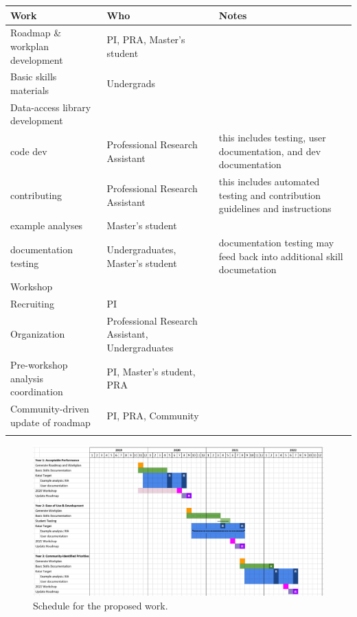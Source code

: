 \begin{tabularx}{\textwidth}{XXX}
Work & Who & Notes \\
\toprule
Roadmap \& workplan development
& PI, PRA, Master's student
& \\

Basic skills materials 
& Undergrads
&  \\

Data-access library development
& 
& \\
code dev
& Professional Research Assistant
& this includes testing, user documentation, and dev documentation\\
contributing
& Professional Research Assistant
& this includes automated testing and contribution guidelines and instructions \\
example analyses
& Master's student
& \\
documentation testing
& Undergraduates, Master's student
& documentation testing may feed back into additional skill documetation \\

Workshop
& 
& \\
Recruiting
& PI
& \\
Organization
& Professional Research Assistant, Undergraduates
& \\
Pre-workshop analysis coordination
& PI, Master's student, PRA
& \\

Community-driven update of roadmap
& PI, PRA, Community
& \\
\label{tab:WBS}
\end{tabularx}

\begin{figure}[htb]
    \begin{center}
      \includegraphics[width=\textwidth]{Figures/schedule1}
    \end{center}
    \caption{Schedule for the proposed work.}
    \label{fig:ops-schedule}
\end{figure}

